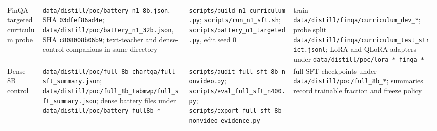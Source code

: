 \documentclass[11pt]{article}
\begin{document}
\begin{table}[t]
\begin{tabular}{@{}L{0.18\textwidth}L{0.31\textwidth}L{0.25\textwidth}L{0.19\textwidth}@{}}
FinQA targeted curriculum probe & \nolinkurl{data/distill/poc/battery_n1_8b.json}, SHA \texttt{03dfef86ad4e}; \nolinkurl{data/distill/poc/battery_n1_32b.json}, SHA \texttt{c808008b06b9}; text-teacher and dense-control companions in same directory & \nolinkurl{scripts/build_n1_curriculum.py}; \nolinkurl{scripts/run_n1_sft.sh}; \nolinkurl{scripts/battery_n1_targeted.py}, edit seed 0 & train \nolinkurl{data/distill/finqa/curriculum_dev_*}; probe split \nolinkurl{data/distill/finqa/curriculum_test_strict.jsonl}; LoRA and QLoRA adapters under \nolinkurl{data/distill/poc/lora_*_finqa_*} \\
Dense 8B control & \nolinkurl{data/distill/poc/full_8b_chartqa/full_sft_summary.json}; \nolinkurl{data/distill/poc/full_8b_tabmwp/full_sft_summary.json}; dense battery files under \nolinkurl{data/distill/poc/battery_full8b_*} & \nolinkurl{scripts/audit_full_sft_8b_nonvideo.py}; \nolinkurl{scripts/eval_full_sft_n400.py}; \nolinkurl{scripts/export_full_sft_8b_nonvideo_evidence.py} & full-SFT checkpoints under \nolinkurl{data/distill/poc/full_8b_*}; summaries record trainable fraction and freeze policy \\
\bottomrule
\end{tabular}
\end{table}



\end{document}
